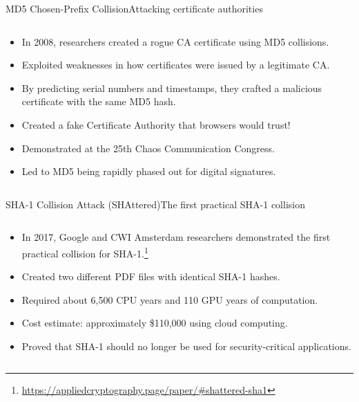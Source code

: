 \documentclass[aspectratio=169, lualatex, handout]{beamer}
\begin{document}
\begin{frame}{MD5 Chosen-Prefix Collision}{Attacking certificate authorities}
	\begin{columns}[c]
		\begin{column}{1\textwidth}
			\begin{itemize}
				\item In 2008, researchers created a rogue CA certificate using MD5 collisions.
				\item Exploited weaknesses in how certificates were issued by a legitimate CA.
				\item By predicting serial numbers and timestamps, they crafted a malicious certificate with the same MD5 hash.
				\item Created a fake Certificate Authority that browsers would trust!
				\item Demonstrated at the 25th Chaos Communication Congress.
				\item Led to MD5 being rapidly phased out for digital signatures.
			\end{itemize}
		\end{column}
	\end{columns}
\end{frame}

\begin{frame}{SHA-1 Collision Attack (SHAttered)}{The first practical SHA-1 collision}
	\begin{columns}[c]
		\begin{column}{1\textwidth}
			\begin{itemize}
				\item In 2017, Google and CWI Amsterdam researchers demonstrated the first practical collision for SHA-1.\footnote{\url{https://appliedcryptography.page/paper/\#shattered-sha1}}
				\item Created two different PDF files with identical SHA-1 hashes.
				\item Required about 6,500 CPU years and 110 GPU years of computation.
				\item Cost estimate: approximately \$110,000 using cloud computing.
				\item Proved that SHA-1 should no longer be used for security-critical applications.
			\end{itemize}
		\end{column}
	\end{columns}
\end{frame}
\end{document}
